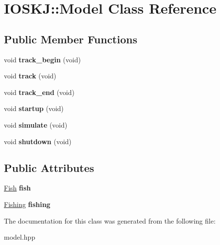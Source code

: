 \hypertarget{classIOSKJ_1_1Model}{\section{I\-O\-S\-K\-J\-:\-:Model Class Reference}
\label{classIOSKJ_1_1Model}
}
\subsection*{Public Member Functions}
\begin{DoxyCompactItemize}
\item 
\hypertarget{classIOSKJ_1_1Model_ae261a53c42f71d17182c1b129698126d}{void {\bfseries track\-\_\-begin} (void)}\label{classIOSKJ_1_1Model_ae261a53c42f71d17182c1b129698126d}

\item 
\hypertarget{classIOSKJ_1_1Model_af18a3687dd2685745174b91e0aae56ce}{void {\bfseries track} (void)}\label{classIOSKJ_1_1Model_af18a3687dd2685745174b91e0aae56ce}

\item 
\hypertarget{classIOSKJ_1_1Model_a03e6aeb637c83c34774ac66c18bac74d}{void {\bfseries track\-\_\-end} (void)}\label{classIOSKJ_1_1Model_a03e6aeb637c83c34774ac66c18bac74d}

\item 
\hypertarget{classIOSKJ_1_1Model_a6f42bfc7352faa7bba7e00d04fc166b0}{void {\bfseries startup} (void)}\label{classIOSKJ_1_1Model_a6f42bfc7352faa7bba7e00d04fc166b0}

\item 
\hypertarget{classIOSKJ_1_1Model_abf9ebdb10aee501808836438cb542fab}{void {\bfseries simulate} (void)}\label{classIOSKJ_1_1Model_abf9ebdb10aee501808836438cb542fab}

\item 
\hypertarget{classIOSKJ_1_1Model_a343216d7c9019f15f01f205423001005}{void {\bfseries shutdown} (void)}\label{classIOSKJ_1_1Model_a343216d7c9019f15f01f205423001005}

\end{DoxyCompactItemize}
\subsection*{Public Attributes}
\begin{DoxyCompactItemize}
\item 
\hypertarget{classIOSKJ_1_1Model_aa8bf5f43996857e428bb0745943363a4}{\hyperlink{classIOSKJ_1_1Fish}{Fish} {\bfseries fish}}\label{classIOSKJ_1_1Model_aa8bf5f43996857e428bb0745943363a4}

\item 
\hypertarget{classIOSKJ_1_1Model_a416c537ca8c64648516e928fcea72ef2}{\hyperlink{classIOSKJ_1_1Fishing}{Fishing} {\bfseries fishing}}\label{classIOSKJ_1_1Model_a416c537ca8c64648516e928fcea72ef2}

\end{DoxyCompactItemize}


The documentation for this class was generated from the following file\-:\begin{DoxyCompactItemize}
\item 
model.\-hpp\end{DoxyCompactItemize}
